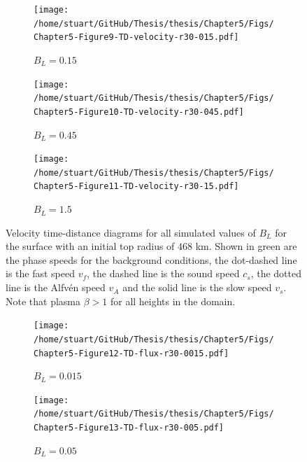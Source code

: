 \documentclass[a4paper,12pt,fourier,authoryear,custommargin]{Classes/PhDThesisPSnPDF}
\begin{document}
\begin{figure}
    \centering
\ContinuedFloat


    \begin{subfigure}[b]{0.9\columnwidth}
        \texttt{[image: /home/stuart/GitHub/Thesis/thesis/Chapter5/Figs/Chapter5-Figure9-TD-velocity-r30-015.pdf]}
        \caption{$B_L = 0.15$}
        \label{fig:TD-velocity-r30-015}
    \end{subfigure}

    \begin{subfigure}[b]{0.9\columnwidth}
        \texttt{[image: /home/stuart/GitHub/Thesis/thesis/Chapter5/Figs/Chapter5-Figure10-TD-velocity-r30-045.pdf]}
        \caption{$B_L = 0.45$}
        \label{fig:TD-velocity-r30-045}
    \end{subfigure}
    \caption{}
    \label{fig:}
\end{figure}

\begin{figure}
    \centering
\ContinuedFloat


    \begin{subfigure}[b]{0.9\columnwidth}
        \texttt{[image: /home/stuart/GitHub/Thesis/thesis/Chapter5/Figs/Chapter5-Figure11-TD-velocity-r30-15.pdf]}
        \caption{$B_L = 1.5$}
        \label{fig:TD-velocity-r30-15}
    \end{subfigure}
    \caption{Velocity time-distance diagrams for all simulated values of $B_L$ for the surface with an initial top radius of $468$ km. Shown in green are the phase speeds for the background conditions, the dot-dashed line is the fast speed $v_f$, the dashed line is the sound speed $c_s$, the dotted line is the Alfv\'en speed $v_A$ and the solid line is the slow speed $v_s$. Note that plasma $\beta > 1$ for all heights in the domain.}
    \label{fig:TD-velocity-r30}
\end{figure}



\begin{figure}
    \centering


    \begin{subfigure}[b]{0.9\columnwidth}
        \texttt{[image: /home/stuart/GitHub/Thesis/thesis/Chapter5/Figs/Chapter5-Figure12-TD-flux-r30-0015.pdf]}
        \caption{$B_L = 0.015$}
        \label{fig:TD-flux-r30-0015}
    \end{subfigure}

    \begin{subfigure}[b]{0.9\columnwidth}
        \texttt{[image: /home/stuart/GitHub/Thesis/thesis/Chapter5/Figs/Chapter5-Figure13-TD-flux-r30-005.pdf]}
        \caption{$B_L = 0.05$}
        \label{fig:TD-flux-r30-005}
    \end{subfigure}
    \caption{}
    \label{fig:}
\end{figure}
\end{document}
